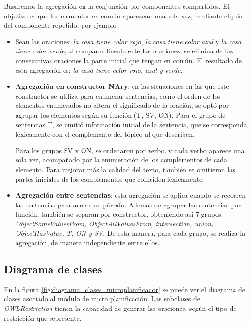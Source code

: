 Basaremos la agregación en la conjunción por componentes compartidos. El objetivo es que los elementos en común aparezcan una sola vez, mediante elipsis del componente repetido, por ejemplo:
\begin{itemize}
    \item Sean las oraciones: \emph{la casa tiene color rojo}, \emph{la casa tiene color azul} y \emph{la casa tiene color verde}, al comparar linealmente las oraciones, se elimina de las consecutivas oraciones la parte inicial que tengan en común. El resultado de esta agregación es: \emph{la casa tiene color rojo, azul y verde}.
\end{itemize}
    
\begin{itemize}
    \item {\bf Agregación en constructor NAry}: en las situaciones en las que este constructor se utiliza para enumerar sentencias, como el orden de los elementos enumerados no altera el significado de la oración, se optó por agrupar los elementos según su función (T, SV, ON). Para el grupo de sentencias T, se omitió información inicial de la sentencia, que se corresponda léxicamente con el complemento del tópico al que describen. 
    
    Para los grupos SV y ON, se ordenaron por verbo, y cada verbo aparece una sola vez, acompañado por la enumeración de los complementos de cada elemento. Para mejorar más la calidad del texto, también se omitieron las partes iniciales de los complementos que coinciden léxicamente.
    
    \item {\bf Agregación entre sentencias}: esta agregación se aplica cuando se recorren las sentencias para armar un párrafo. Además de agrupar las sentencias por función, también se separan por constructor, obteniendo así 7 grupos: \emph{ObjectSomeValuesFrom, ObjectAllValuesFrom, intersection, union, ObjectHasValue, T, ON y SV}. De esta manera, para cada grupo, se realiza la agregación, de manera independiente entre ellos.
\end{itemize}

\subsection{Diagrama de clases}
En la figura \ref{fig:diagrama_clases_microplanificador} se puede ver el diagrama de clases asociado al módulo de micro planificación. Las subclases de \emph{OWLRestriction} tienen la capacidad de generar las oraciones, según el tipo de restricción que represente.

